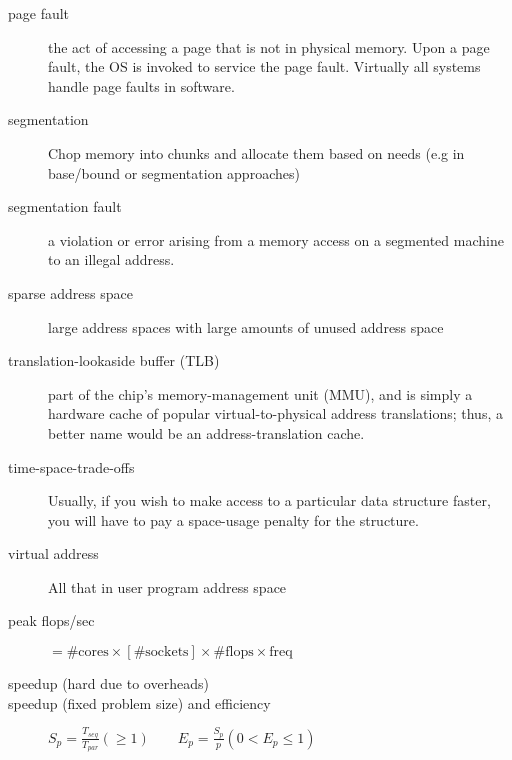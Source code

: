 \begin{description}
\item[page fault] the act of accessing a page that is not in physical memory.  Upon a page fault, the OS is invoked to service the page fault.  Virtually all systems handle page faults in software.

\item[segmentation] Chop memory into  chunks and allocate them based on needs (e.g in base/bound or segmentation approaches)

\item[segmentation fault] a violation or error arising from a memory access on a segmented machine to an illegal address.

\item[sparse address space] large address spaces with large amounts of unused address space

\item[translation-lookaside buffer (TLB)] part of the chip’s memory-management unit (MMU), and is simply a hardware cache of popular virtual-to-physical address translations; thus, a better name would be an address-translation cache.

\item[time-space-trade-offs] Usually, if you wish to make access to a particular data structure faster, you will have to pay a space-usage penalty for the structure.

\item[virtual address] All that in user program address space



\item[peak flops/sec] $ = \# \text{cores} \times [\# \text{sockets}] \times \# \text{flops} \times \text{freq}$

\item[speedup (hard due to overheads)]

\item[speedup (fixed problem size) and efficiency] $S_p = \frac{T_{seq}}{T_{par}} (\geq 1)\qquad E_p = \frac{S_{p}}{p} (0 < E_p \leq 1)$



\end{description}
